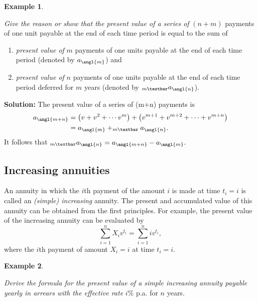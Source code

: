 \documentclass[
]{book}
\theoremstyle{definition}
\theoremstyle{definition}
\newtheorem{example}{Example}[chapter]
\theoremstyle{definition}
\theoremstyle{definition}
\theoremstyle{remark}
\begin{document}
\begin{example}
\protect\hypertarget{exm:unlabeled-div-34}{}\label{exm:unlabeled-div-34}

\emph{Give the reason or show that the present value of a series of} \((n+m)\)
payments of one unit payable at the end of each time period is equal to
the sum of

\begin{enumerate}
\def\labelenumi{\arabic{enumi}.}
\item
  \emph{present value of} \(m\) payments of one units payable at the end of
  each time period (denoted by \(a_\angl{m}\)) and
\item
  \emph{present value of} \(n\) payments of one units payable at the end of
  each time period deferred for \(m\) years (denoted by
  \(_{m \textbar}a_\angl{n}\)).
\end{enumerate}

\end{example}

\textbf{Solution:} The present value of a series of (m+n) payments is
\[\begin{aligned}
a_\angl{m+n} &=  \left( v + v^2 + \cdots  v^m\right) + \left( v^{m+1} + v^{m+2} + \cdots +v^{m+n} \right) \\
&= a_\angl{m} + _{m \textbar}a_\angl{n}.\end{aligned}\] It follows that
\(_{m \textbar}a_\angl{n} = a_\angl{m+n} - a_\angl{m}.\)

\hypertarget{increasing-annuities}{%
\subsection{Increasing annuities}\label{increasing-annuities}}

An annuity in which the \(i\)th payment of the amount \(i\) is made at time
\(t_i = i\) is called an \emph{(simple) increasing} annuity. The present and
accumulated value of this annuity can be obtained from the first
principles. For example, the present value of the increasing annuity can
be evaluated by \[\sum_{i=1}^n X_i v^{t_i} = \sum_{i=1}^n i v^{t_i},\]
where the \(i\)th payment of amount \(X_i = i\) at time \(t_i = i\).

\begin{example}
\protect\hypertarget{exm:unlabeled-div-35}{}\label{exm:unlabeled-div-35}

\emph{Derive the formula for the present value of a simple increasing annuity
payable yearly in arrears with the effective rate} \(i\%\) p.a. for \(n\)
years.

\end{example}
\end{document}
